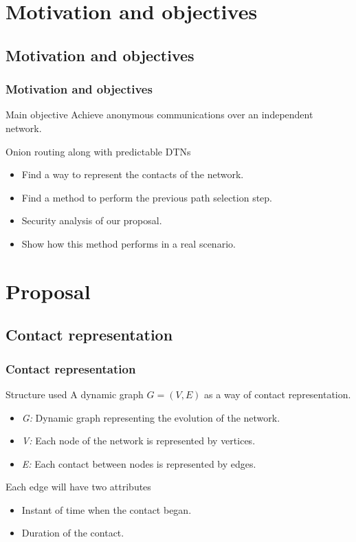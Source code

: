 \documentclass[compress,red]{beamer}
\begin{document}
\section{Motivation and objectives}
\subsection{Motivation and objectives}
\begin{frame}
\frametitle{Motivation and objectives}
\begin{block}{Main objective}
Achieve anonymous communications over an independent network.
\end{block}
\bigskip
\begin{block}{Onion routing along with predictable DTNs}
\begin{itemize}
\item Find a way to \alert{represent the contacts} of the network.
\item Find a method to perform the previous \alert{path selection} step.
\item \alert{Security analysis} of our proposal.
\item Show how this method performs in a \alert{real scenario}.
\end{itemize}
\end{block}
\end{frame}

\section{Proposal}
\subsection{Contact representation}
\begin{frame}
\frametitle{Contact representation}
\begin{block}{Structure used}
A dynamic graph $G = (V,E)$ as a way of contact representation.
\end{block}
\bigskip
\begin{itemize}
\item \textit{G:} Dynamic graph representing the evolution of the network.
\item \textit{V:} Each \alert{node} of the network is represented by \alert{vertices}.
\item \textit{E:} Each \alert{contact} between nodes is represented by \alert{edges}.
\end{itemize}
\bigskip
\begin{block}{Each edge will have two attributes}
\begin{itemize}
\item Instant of time when the contact began.
\item  Duration of the contact.
\end{itemize}
\end{block}
\end{frame}
\end{document}
